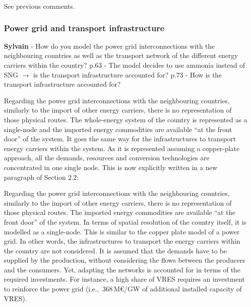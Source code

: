 \documentclass[12pt,a4paper]{article}
\def\ie{i.e.,\ }
\begin{document}
\noindent See previous comments.

\subsubsection{Power grid and transport infrastructure}

\begin{mdframed}[style=comment] %
{\color{purple} \textbf{Sylvain}} - How do you model the power grid interconnections with the neighbouring countries as well as the transport network of the different energy carriers within the country? p.63 - The model decides to use ammonia instead of SNG $\rightarrow$ is the transport infrastructure accounted for? p.73 - How is the transport infrastructure accounted for?
\end{mdframed}

\noindent Regarding the power grid interconnections with the neighbouring countries, similarly to the import of other energy carriers, there is no representation of those physical routes. The whole-energy system of the country is represented as a single-node and the imported energy commodities are available ``at the front door'' of the system. It goes the same way for the infrastructures to transport energy carriers within the system. As it is represented assuming a copper-plate approach, all the demands, resources and conversion technologies are concentrated in one single node. This is now explicitly written {\color{blue}in a new paragraph of Section 2.2}:

\begin{mdframed}[style=manuscript] %
Regarding the power grid interconnections with the neighbouring countries, similarly to the import of other energy carriers, there is no representation of those physical routes. The imported energy commodities are available ``at the front door'' of the system.  In terms of spatial resolution of the country itself, it is modelled as a single-node. This is similar to the copper plate model of a power grid. In other words, the infrastructures to transport the energy carriers within the country are not considered.  It is assumed that the demands have to be supplied by the production, without considering the flows between the producers and the consumers. Yet, adapting the networks is accounted for in terms of the required investments. For instance, a high share of VRES requires an investment to reinforce the power grid (\ie 368\,M€/GW of additional installed capacity of VRES). 
\end{mdframed}
\end{document}
